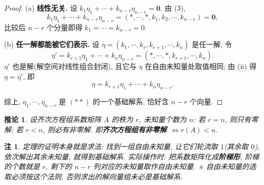 \documentclass[UTF8,11pt]{ctexart}
\theoremstyle{cnthm}
\newtheorem{cor}[thm]{推论}
\newtheorem{rem}[thm]{注}
\begin{document}
\begin{proof}
(a) \textbf{线性无关.} 设 $k_1\eta_1+\cdots+k_{n-r}\eta_{n-r}=\mathbf 0$. 由 (3),
\[
k_1\eta_1+\cdots+k_{n-r}\eta_{n-r}=(*,\cdots,*,k_1,k_2,\cdots,k_{n-r})=\mathbf 0 ,
\]
比较后 $n-r$ 个分量即得 $k_1=\cdots=k_{n-r}=0$.

(b) \textbf{任一解都能被它们表示.} 设 $\eta=(k_1,\cdots,k_r,k_{r+1},\cdots,k_n)$ 是任一解, 令
\[
\eta'=k_{r+1}\eta_1+\cdots+k_n\eta_{n-r}=(*,\cdots,*,k_{r+1},\cdots,k_n).
\]
$\eta'$ 也是解(解空间对线性组合封闭), 且它与 $\eta$ 在自由未知量处取值相同; 由 (ii) 得 $\eta=\eta'$, 即
\[
\eta=k_{r+1}\eta_1+\cdots+k_n\eta_{n-r}.
\]

综上, $\eta_1,\cdots,\eta_{n-r}$ 是 $(**)$ 的一个基础解系, 恰好含 $n-r$ 个向量.
\end{proof}

\begin{cor}
设齐次方程组系数矩阵 $A$ 的秩为 $r$, 未知量个数为 $n$: 若 $r=n$, 则只有零解; 若 $r<n$, 则必有非零解. 即\textbf{齐次方程组有非零解 $\iff r(A)<n$}.
\end{cor}

\begin{rem}
定理的证明本身就是求法: 找到一组自由未知量, 让它们轮流取 $1$(其余取 $0$), 依次解出其余未知量, 就得到基础解系. 实际操作时: 把系数矩阵化成\textbf{阶梯形}, 阶梯的个数就是 $r$, 剩下的 $n-r$ 列对应的未知量取作自由未知量. ※ 自由未知量的选取必须按这个法则, 否则求出的解向量组未必是基础解系.
\end{rem}
\end{document}
